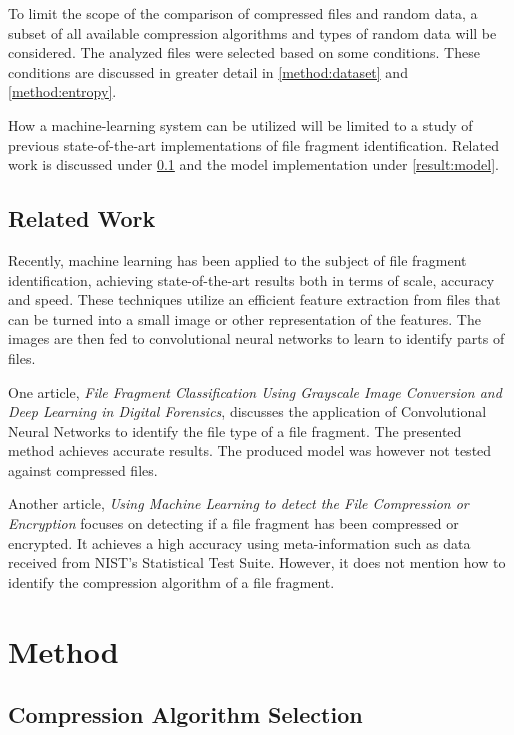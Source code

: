 \documentclass[conference]{IEEEtran}
\begin{document}
To limit the scope of the comparison of compressed files and random data, a subset of all available compression algorithms and types of random data will be considered. The analyzed files were selected based on some conditions. These conditions are discussed in greater detail in \ref{method:dataset} and \ref{method:entropy}.

How a machine-learning system can be utilized will be limited to a study of previous state-of-the-art implementations of file fragment identification. Related work is discussed under \ref{introduction:related} and the model implementation under \ref{result:model}.

\subsection{Related Work}
\label{introduction:related}
Recently, machine learning has been applied to the subject of file fragment identification, achieving state-of-the-art results both in terms of scale, accuracy and speed. These techniques utilize an efficient feature extraction from files that can be turned into a small image or other representation of the features. The images are then fed to convolutional neural networks to learn to identify parts of files.

One article, \textit{File Fragment Classification Using Grayscale Image Conversion and Deep Learning in Digital Forensics}, discusses the application of Convolutional Neural Networks to identify the file type of a file fragment. The presented method achieves accurate results. The produced model was however not tested against compressed files\cite{chen2018}.

Another article, \textit{Using Machine Learning to detect the File Compression or Encryption} focuses on detecting if a file fragment has been compressed or encrypted. It achieves a high accuracy using meta-information such as data received from NIST's Statistical Test Suite. However, it does not mention how to identify the compression algorithm of a file fragment\cite{hahn2018}.

\section{Method}

\subsection{Compression Algorithm Selection}
\end{document}
